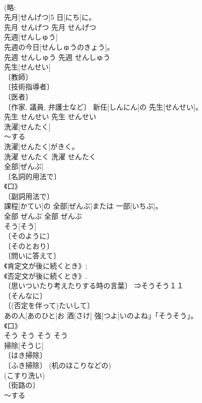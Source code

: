 \documentclass[8pt]{extreport}
\begin{document}
\begin{CJK}{UTF8}{min}
\\	(略: 
\\	先月[せんげつ]5 日[にち]に。	
\\	先月	せんげつ	先月	せんげつ	
\\	先週[せんしゅう]	
\\	先週の今日[せんしゅうのきょう]。	
\\	先週	せんしゅう	先週	せんしゅう	
\\	先生[せんせい]	
\\	〔教師〕 
\\	〔技術指導者〕 
\\	〔医者〕 
\\	〔作家, 議員, 弁護士など〕	新任[しんにん]の 先生[せんせい]。	
\\	先生	せんせい	先生	せんせい	
\\	洗濯[せんたく]	
\\	～する 
\\	洗濯[せんたく]がきく。	
\\	洗濯	せんたく	洗濯	せんたく	
\\	全部[ぜんぶ]	
\\	〔名詞的用法で〕 
\\	《口》 
\\	〔副詞用法で〕 
\\	課程[かてい]の 全部[ぜんぶ]または 一部[いちぶ]。	
\\	全部	ぜんぶ	全部	ぜんぶ	
\\	そう[そう]	
\\	〔そのように〕 
\\	〔そのとおり〕 
\\	〔問いに答えて〕 
\\	《肯定文が後に続くとき》; 
\\	《否定文が後に続くとき》. 
\\	〔思いついたり考えたりする時の言葉〕 ⇒そうそう１１ 
\\	〔そんなに〕 
\\	〔(否定を伴って)たいして〕 
\\	あの人[あのひと]お 酒[さけ] 強[つよ]いのよね」「そうそう」。	
\\	《口》 
\\	そう	そう	そう	そう	
\\	掃除[そうじ]	
\\	〔はき掃除〕 
\\	〔ふき掃除〕 (机のほこりなどの) 
\\	(こすり洗い) 
\\	〔街路の〕 
\\	～する 

\end{CJK}
\end{document}
